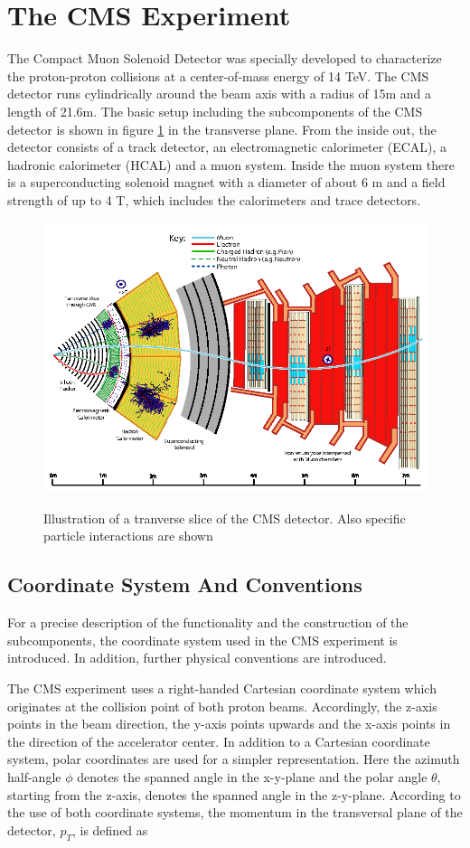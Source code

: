 \documentclass[12pt, a4paper]{thesis}
\begin{document}
\section{The CMS Experiment}
\label{sec:orge5edd5f}
The Compact Muon Solenoid Detector was specially developed to
characterize the proton-proton collisions at a center-of-mass energy
of 14 TeV. The CMS detector runs cylindrically around the beam axis
with a radius of 15m and a length of 21.6m. The basic setup including
the subcomponents of the CMS detector is shown in figure
\ref{cms-detector} in the transverse plane.  From the inside out, the
detector consists of a track detector, an electromagnetic calorimeter
(ECAL), a hadronic calorimeter (HCAL) and a muon system.  Inside the
muon system there is a superconducting solenoid magnet with a diameter
of about 6 m and a field strength of up to 4 T, which includes the
calorimeters and trace detectors.
\begin{figure}[htbp]
\centering
\includegraphics[width=0.8 \textwidth]{../images/cms_detector.png}
\label{cms-detector}
\caption{Illustration of a tranverse slice of the CMS detector. Also specific particle interactions are shown \cite{sirunyan17}}
\end{figure}

\subsection{Coordinate System And Conventions}
\label{sec:org067f254}

For a precise description of the functionality and the construction of
the subcomponents, the coordinate system used in the CMS experiment is
introduced. In addition, further physical conventions are introduced.

The CMS experiment uses a right-handed Cartesian coordinate system which
originates at the collision point of both proton beams. Accordingly, the z-axis
points in the beam direction, the y-axis points upwards and the x-axis points in
the direction of the accelerator center. In addition to a Cartesian coordinate
system, polar coordinates are used for a simpler representation. Here the
azimuth half-angle \(\phi\) denotes the spanned angle in the x-y-plane and the polar
angle \(\theta\), starting from the z-axis, denotes the spanned angle in the
z-y-plane.
According to the use of both coordinate systems, the momentum in the transversal
plane of the detector, \(p_T\), is defined as
\end{document}
